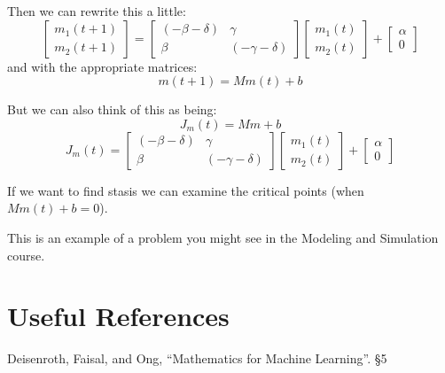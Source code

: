 Then we can rewrite this a little:
\[
\begin{bmatrix}m_1(t+1)\\m_2(t+1)\end{bmatrix} = 
\begin{bmatrix} (- \beta-\delta) & \gamma\\ \beta& (-\gamma- \delta)\end{bmatrix}
\begin{bmatrix}m_1(t)\\m_2(t)\end{bmatrix} +
\begin{bmatrix}\alpha\\0\end{bmatrix}
\]
and with the appropriate matrices:
\[m(t+1)=Mm(t)+b\]

But we can also think of this as being: 
\[J_m(t) = Mm+b\]
\[
J_m(t) = 
\begin{bmatrix} (- \beta-\delta) & \gamma\\ \beta& (-\gamma- \delta)\end{bmatrix}
\begin{bmatrix}m_1(t)\\m_2(t)\end{bmatrix} +
\begin{bmatrix}\alpha\\0\end{bmatrix}
\]

If we want to find stasis we can examine the critical points (when $Mm(t)+b=0$). 

This is an example of a problem you might see in the Modeling and Simulation course. 
\fi


\section*{Useful References}
Deisenroth, Faisal, and Ong, ``Mathematics for Machine Learning''. \S 5

\clearpage

